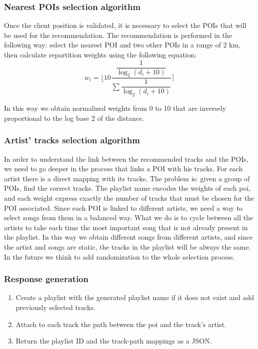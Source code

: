 \documentclass[paper=a4, fontsize=11pt]{scrartcl}
\begin{document}
\subsubsection{Nearest POIs selection algorithm}
Once the client position is validated, it is necessary to select the POIs that will be used for the recommendation.
The recommendation is performed in the following way: select the nearest POI and two other POIs in a range of 2 km, then calculate repartition weights using the following equation:
$$w_i = \Bigg \lfloor 10 \dfrac{\dfrac{1}{\log_2 (d_i + 10)}}{\sum \dfrac{1}{\log_2 (d_i + 10)} } \Bigg \rceil$$

In this way we obtain normalized weights from 0 to 10 that are inversely proportional to the log base 2 of the distance.

\subsubsection{Artist' tracks selection algorithm}
In order to understand the link between the recommended tracks and the POIs, we need to go deeper in the process that links a POI with his tracks.
For each artist there is a direct mapping with its tracks.
The problem is: given a group of POIs, find the correct tracks.
The playlist name encodes the weights of each poi, and each weight express exactly the number of tracks that must be chosen for the POI associated.
Since each POI is linked to different artists, we need a way to select songs from them in a balanced way.
What we do is to cycle between all the artists to take each time the most important song that is not already present in the playlist. In this way we obtain different songs from different artists, and since the artist and songs are static, the tracks in the playlist will be always the same. In the future we think to add randomization to the whole selection process.

\subsubsection{Response generation}
\begin{enumerate}
\item Create a playlist with the generated playlist name if it does not exist and add previously selected tracks.
\item Attach to each track the path between the poi and the track's artist.
\item Return the playlist ID and the track-path mappings as a JSON.
\end{enumerate}
\end{document}
